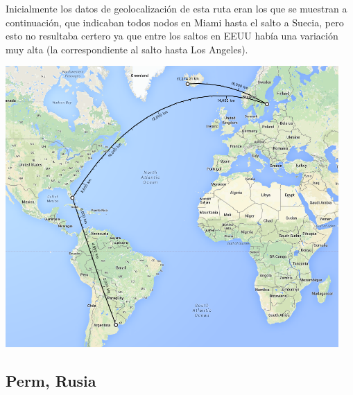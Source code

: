 Inicialmente los datos de geolocalización de esta ruta eran los que se muestran a continuación, que indicaban todos nodos en Miami hasta el salto a Suecia, pero esto no resultaba certero ya que entre los saltos en EEUU había una variación muy alta (la correspondiente al salto hasta Los Angeles).

\includegraphics[width=5in]{imgs/maps/iceland.png}

\subsection{Perm, Rusia}

